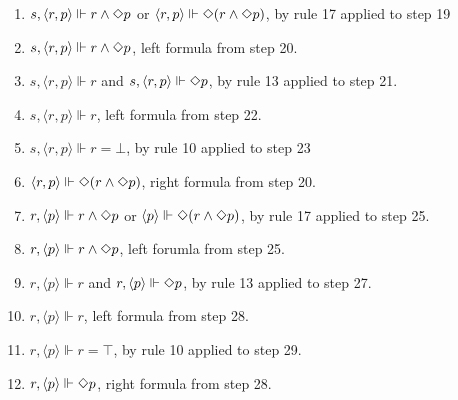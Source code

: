\begin{myEx}
\begin{enumerate}
\item $s, \langle r,p \rangle \Vdash r \land \Diamond p$ or $\langle r,p \rangle \Vdash \Diamond(r \land \Diamond p)$, by rule 17 applied to step 19\\ %

\item $s, \langle r,p \rangle \Vdash r \land \Diamond p$, left formula from step 20.\\ %

\item $s, \langle r,p \rangle \Vdash r$ and $s, \langle r,p \rangle \Vdash \Diamond p$, by rule 13 applied to step 21.\\ %

\item $s, \langle r,p \rangle \Vdash r$, left formula from step 22.\\ %

\item $s, \langle r,p \rangle \Vdash r = \bot$, by rule 10 applied to step 23\\ %

\item $\langle r,p \rangle \Vdash \Diamond(r \land \Diamond p)$, right formula from step 20.\\ %

\item $r, \langle p \rangle \Vdash r \land \Diamond p$ or $\langle p \rangle \Vdash \Diamond(r \land \Diamond p)$, by rule 17 applied to step 25.\\ %

\item $r, \langle p \rangle \Vdash r \land \Diamond p$, left forumla from step 25.\\ %

\item $r, \langle p \rangle \Vdash r$ and $r, \langle p \rangle \Vdash \Diamond p$, by rule 13 applied to step 27.\\ %

\item $r, \langle p \rangle \Vdash r$, left formula from step 28.\\ %

\item $r, \langle p \rangle \Vdash r = \top$, by rule 10 applied to step 29.\\ %

\item $r, \langle p \rangle \Vdash \Diamond p$, right formula from step 28.\\ %


\end{enumerate}
\end{myEx}

